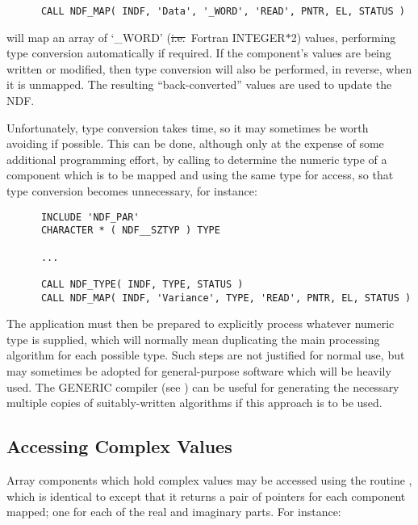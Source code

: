 \small
\begin{verbatim}
      CALL NDF_MAP( INDF, 'Data', '_WORD', 'READ', PNTR, EL, STATUS )
\end{verbatim}
\normalsize

will map an array of `\_WORD' (\st{i.e.}\ Fortran INTEGER$*$2) values,
performing type conversion automatically if required. 
If the component's values are being written or modified, then type
conversion will also be performed, in reverse, when it is unmapped. 
The resulting ``back-converted'' values are used to update the NDF. 

Unfortunately, type conversion takes time, so it may sometimes be worth
avoiding if possible.
This can be done, although only at the expense of some additional
programming effort, by calling  to determine the numeric type of a
component which is to be mapped and using the same type for access, so that
type conversion becomes unnecessary, for instance: 

\small
\begin{verbatim}
      INCLUDE 'NDF_PAR'
      CHARACTER * ( NDF__SZTYP ) TYPE

      ...

      CALL NDF_TYPE( INDF, TYPE, STATUS )
      CALL NDF_MAP( INDF, 'Variance', TYPE, 'READ', PNTR, EL, STATUS )
\end{verbatim}
\normalsize

The application must then be prepared to explicitly process whatever numeric 
type is supplied, which will normally mean duplicating the main processing 
algorithm for each possible type.
Such steps are not justified for normal use, but may sometimes be adopted
for general-purpose software which will be heavily used. 
The GENERIC compiler (see ) can be useful for
generating the necessary multiple copies of suitably-written
algorithms if this approach is to be used.

\subsection{\label{ss:complexaccess}Accessing Complex Values}

Array components which hold complex values may be accessed using the
routine , which is identical to  except that it returns a
pair of pointers for each component mapped; one for each of the real and
imaginary parts. 
For instance: 

